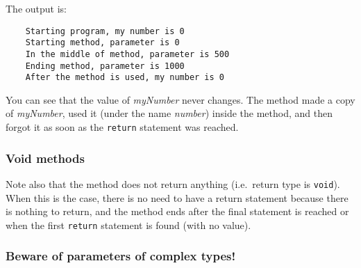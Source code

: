 The output is: 

\begin{verbatim}
    Starting program, my number is 0
    Starting method, parameter is 0
    In the middle of method, parameter is 500
    Ending method, parameter is 1000
    After the method is used, my number is 0
\end{verbatim}

You can see that the value of \emph{myNumber} never changes. The
method made a copy of \emph{myNumber}, used it (under the name
\emph{number}) inside the method, and then forgot it as soon as the
\verb+return+ statement was reached. 

\subsubsection*{Void methods}
\label{void}

Note also that the method does not return anything (i.e.~return type
is \verb+void+). When this is the case, there is no need to have a
return statement because there is nothing to return, and the method
ends after the final statement is reached or when the first \verb+return+
statement is found (with no value). 


\subsubsection{Beware of parameters of complex types!}
\label{beware}









